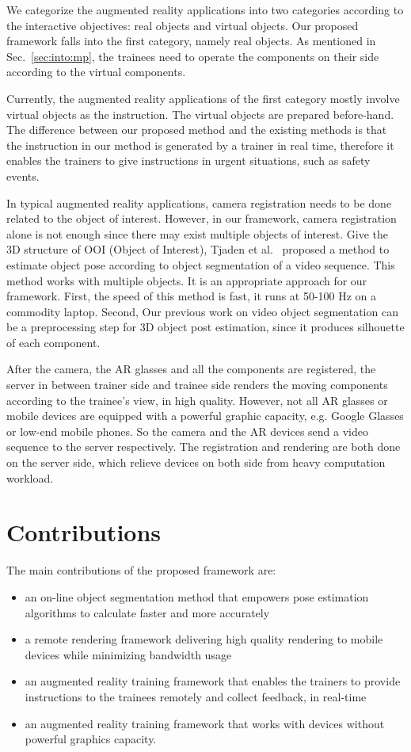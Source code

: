 We categorize the augmented reality applications into two categories according to the interactive objectives: real objects and virtual objects. Our proposed framework falls into the first category, namely real objects. As mentioned in Sec.~\ref{sec:into:mp}, the trainees need to operate the components on their side according to the virtual components.

Currently, the augmented reality applications of the first category mostly involve virtual objects as the instruction. The virtual objects are prepared before-hand.
The difference between our proposed method and the existing methods is that the instruction in our method is generated by a trainer in real time, therefore it enables the trainers to give instructions in urgent situations, such as safety events.

In typical augmented reality applications, camera registration needs to be done related to the object of interest. However, in our framework, camera registration alone is not enough since there may exist multiple objects of interest.
Give the 3D structure of OOI (Object of Interest), Tjaden et al.~\cite{tjaden2016} proposed a method to estimate object pose according to object segmentation of a video sequence. This method works with multiple objects.
It is an appropriate approach for our framework. First, the speed of this method is fast, it runs at 50-100 Hz on a commodity laptop. Second, Our previous work on video object segmentation can be a preprocessing step for 3D object post estimation, since it produces silhouette of each component.

After the camera, the AR glasses and all the components are registered, the server in between trainer side and trainee side renders the moving components according to the trainee's view, in high quality.
However, not all AR glasses or mobile devices are equipped with a powerful graphic capacity, e.g. Google Glasses or low-end mobile phones.
So the camera and the AR devices send a video sequence to the server respectively. The registration and rendering are both done on the server side, which relieve devices on both side from heavy computation workload.

\section{Contributions}

The main contributions of the proposed framework are:

\begin{itemize}
  \item
  an on-line object segmentation method that empowers pose estimation algorithms to calculate faster and more accurately
  \item
  a remote rendering framework delivering high quality rendering to mobile devices while minimizing bandwidth usage
  \item
  an augmented reality training framework that enables the trainers to provide instructions to the trainees remotely and collect feedback, in real-time
  \item
  an augmented reality training framework that works with devices without powerful graphics capacity.
\end{itemize}


